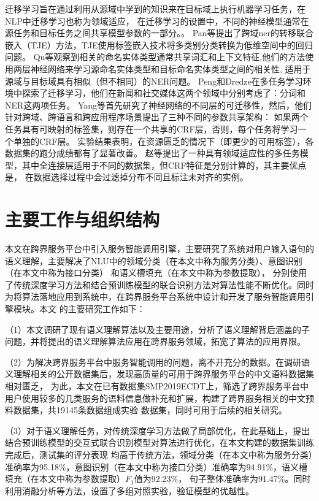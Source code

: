 迁移学习旨在通过利用从源域中学到的知识来在目标域上执行机器学习任务\cite{pan2009survey}，在NLP中迁移学习也称为领域适应，
在迁移学习的设置中，不同的神经模型通常在源任务和目标任务之间共享模型参数的一部分。。 
Pan等提出了跨域ner的转移联合嵌入（TJE）方法，TJE使用标签嵌入技术将多类别分类转换为低维空间中的回归问题\cite{pan2013transfer}。 
Qu等观察到相关的命名实体类型通常共享词汇和上下文特征\cite{qu2016named},他们的方法使用两层神经网络来学习源命名实体类型和目标命名实体类型之间的相关性,
适用于源域与目标域具有相似（但不相同）的NER问题。 
Peng和Dredze在多任务学习环境中探索了迁移学习\cite{peng2016multi}，他们在新闻和社交媒体这两个领域中分别考虑了：分词和NER这两项任务。
Yang等首先研究了神经网络的不同层的可迁移性\cite{yang2017transfer}，然后，他们针对跨域、跨语言和跨应用程序场景提出了三种不同的参数共享架构：
如果两个任务具有可映射的标签集，则存在一个共享的CRF层，否则，每个任务将学习一个单独的CRF层。
实验结果表明，在资源匮乏的情况下（即更少的可用标签），各数据集的跑分成绩都有了显著改善。 
赵等提出了一种具有领域适应性的多任务模型，其中全连接层适用于不同的数据集，但CRF特征是分别计算的，其主要优点是，
在数据选择过程中会过滤掉分布不同且标注未对齐的实例\cite{zhao2018improve}。



\section{主要工作与组织结构}
本文在跨界服务平台中引入服务智能调用引擎，主要研究了系统对用户输入语句的语义理解，主要解决了NLU中的领域分类（在本文中称为服务分类）、意图识别（在本文中称为接口分类）
和语义槽填充（在本文中称为参数提取），
分别使用了传统深度学习方法和结合预训练模型的联合识别方法对算法性能不断优化。同时为将算法落地应用到系统中，在跨界服务平台系统中设计和开发了服务智能调用引擎模块。本文
的主要研究工作如下：

（1）本文调研了现有语义理解算法以及主要用途，分析了语义理解背后涵盖的子问题，并将提出的语义理解算法应用在跨界服务领域，拓宽了算法的应用界限。

（2）为解决跨界服务平台中服务智能调用的问题，离不开充分的数据。在调研语义理解相关的公开数据集后，发现高质量的可用于跨界服务平台的中文语料数据集相对匮乏，
为此，本文在已有数据集SMP2019ECDT上，筛选了跨界服务平台中用户使用较多的几类服务的语料信息做补充和扩展，构建了跨界服务相关的中文预料数据集，共19145条数据组成实验
数据集，同时可用于后续的相关研究。

（3）对于语义理解任务，对传统深度学习方法做了局部优化，在此基础上，提出结合预训练模型的交互式联合识别模型对算法进行优化，在本文构建的数据集训练完成后，测试集的评分表现
均高于传统方法，领域分类（在本文中称为服务分类）准确率为95.18\%，意图识别（在本文中称为接口分类）准确率为94.91\%，语义槽填充（在本文中称为参数提取）$F_1$值为92.23\%，
句子整体准确率为91.47\%。同时利用消融分析等方法，设置了多组对照实验，验证模型的优越性。

